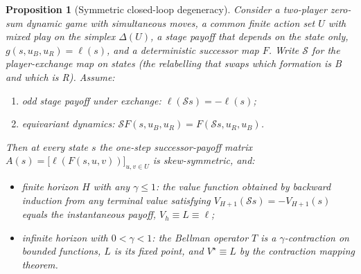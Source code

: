 \documentclass[12pt,a4paper]{article}
\newtheorem{proposition}{Proposition}
\begin{document}
\begin{proposition}[Symmetric closed-loop degeneracy]\label{prop:deg}
Consider a two-player zero-sum dynamic game with simultaneous moves, a
common finite action set $U$ with mixed play on the simplex $\Delta(U)$, a
stage payoff that depends on the state only, $g(s,u_B,u_R)=\ell(s)$, and a
deterministic successor map $F$.  Write
$\mathcal S$ for the \emph{player-exchange map} on states (the relabelling
that swaps which formation is B and which is R).  Assume:
\begin{enumerate}
\item[(A1)] \emph{odd stage payoff under exchange}: $\ell(\mathcal S s)
      = -\ell(s)$;
\item[(A2)] \emph{equivariant dynamics}: $\mathcal S F(s,u_B,u_R)
      = F(\mathcal S s, u_R, u_B)$.
\end{enumerate}
Then at every state $s$ the one-step successor-payoff matrix
$A(s)=\bigl[\ell(F(s,u,v))\bigr]_{u,v\in U}$ is skew-symmetric, and:
\begin{itemize}
\item[(i)] \emph{finite horizon $H$ with any $\gamma\le1$}: the value
      function obtained by backward induction from any terminal value
      satisfying $V_{H+1}(\mathcal S s)=-V_{H+1}(s)$ equals the
      instantaneous payoff, $V_h\equiv L\equiv\ell$;
\item[(ii)] \emph{infinite horizon with $0<\gamma<1$}: the Bellman
      operator $T$ is a $\gamma$-contraction on bounded functions, $L$ is
      its fixed point, and $V^\star\equiv L$ by the contraction mapping
      theorem.
\end{itemize}
\end{proposition}
\end{document}
